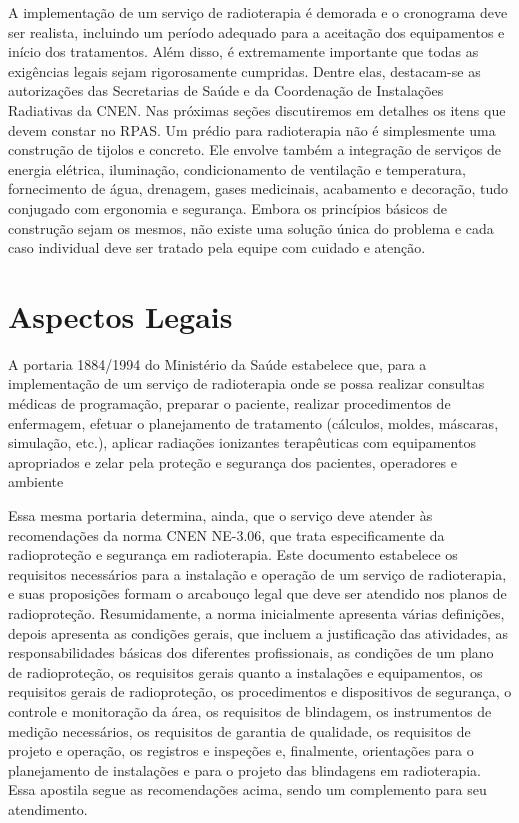 \documentclass[
	12pt,				%
    oneside,			%
	a4paper,			%
	english,			%
	french,				%
	spanish,			%
	brazil,				%
	]{abntex2}
\begin{document}
A implementação de um serviço de radioterapia é demorada e o cronograma deve ser realista, incluindo um período adequado para a aceitação dos equipamentos e início dos tratamentos. Além disso, é extremamente importante que todas as exigências legais sejam rigorosamente cumpridas. Dentre elas, destacam-se as autorizações das Secretarias de Saúde e da Coordenação de Instalações Radiativas da CNEN. Nas próximas seções discutiremos em detalhes os itens que devem constar no RPAS. Um prédio para radioterapia não é simplesmente uma construção de tijolos e concreto. Ele envolve também a integração de serviços de energia elétrica, iluminação, condicionamento de ventilação e temperatura, fornecimento de água, drenagem, gases medicinais, acabamento e decoração, tudo conjugado com ergonomia e segurança. Embora os princípios básicos de construção sejam os mesmos, não existe uma solução única do problema e cada caso individual deve ser tratado pela equipe com cuidado e atenção.


\chapter{Aspectos Legais}

A portaria 1884/1994 do Ministério da Saúde estabelece que, para a implementação de um serviço de radioterapia onde se possa realizar consultas médicas de programação, preparar o paciente, realizar procedimentos de enfermagem, efetuar o planejamento de tratamento (cálculos, moldes, máscaras, simulação, etc.), aplicar radiações ionizantes terapêuticas com equipamentos apropriados e zelar pela proteção e segurança dos pacientes, operadores e ambiente

Essa mesma portaria determina, ainda, que o serviço deve atender às recomendações da norma CNEN NE-3.06, que trata especificamente da radioproteção e segurança em radioterapia. Este documento estabelece os requisitos necessários para a instalação e operação de um serviço de radioterapia, e suas proposições formam o arcabouço legal que deve ser atendido nos planos de radioproteção. Resumidamente, a norma inicialmente apresenta várias definições, depois apresenta as condições gerais, que incluem a justificação das atividades, as responsabilidades básicas dos diferentes profissionais, as condições de um plano de radioproteção, os requisitos gerais quanto a instalações e equipamentos, os requisitos gerais de radioproteção, os procedimentos e dispositivos de segurança, o controle e monitoração da área, os requisitos de blindagem, os instrumentos de medição necessários, os requisitos de garantia de qualidade, os requisitos de projeto e operação, os registros e inspeções e, finalmente, orientações para o planejamento de instalações e para o projeto das blindagens em radioterapia. Essa apostila segue as recomendações acima, sendo um complemento para seu atendimento.
\end{document}

